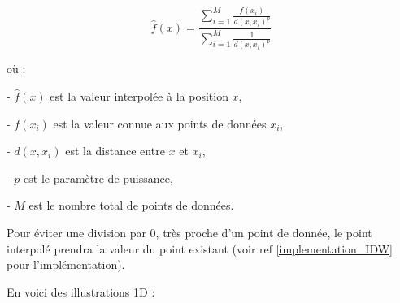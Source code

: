 \[
\hat{f}(x) = \frac{\sum_{i=1}^{M} \frac{f(x_i)}{d(x, x_i)^p}}{\sum_{i=1}^{M} \frac{1}{d(x, x_i)^p}}
\]

où :

- \(\hat{f}(x)\) est la valeur interpolée à la position \(x\),

- \(f(x_i)\) est la valeur connue aux points de données \(x_i\),

- \(d(x, x_i)\) est la distance entre \(x\) et \(x_i\),

- \(p\) est le paramètre de puissance,

- \(M\) est le nombre total de points de données.

\vspace*{0,5cm}

Pour éviter une division par 0, très proche d'un point de donnée, le point interpolé prendra la valeur du point existant (voir ref \ref{implementation_IDW} pour l'implémentation).

\vspace*{0,5cm}


En voici des illustrations 1D :

